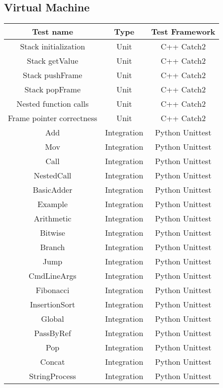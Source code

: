 \documentclass[manuscript,screen,nonacm]{acmart}
\begin{document}
\subsection{Virtual Machine}

\begin{center}
\begin{tabular}{|c|c|c|}
    \hline
    Test name & Type & Test Framework \\
    \hline
    Stack initialization & Unit & C++ Catch2 \\
    Stack getValue & Unit & C++ Catch2 \\
    Stack pushFrame & Unit & C++ Catch2 \\
    Stack popFrame & Unit & C++ Catch2 \\
    Nested function calls & Unit & C++ Catch2 \\
    Frame pointer correctness & Unit & C++ Catch2 \\
    Add & Integration & Python Unittest \\
    Mov & Integration & Python Unittest \\
    Call & Integration & Python Unittest \\
    NestedCall & Integration & Python Unittest \\
    BasicAdder & Integration & Python Unittest \\
    Example & Integration & Python Unittest \\
    Arithmetic & Integration & Python Unittest \\
    Bitwise & Integration & Python Unittest \\
    Branch & Integration & Python Unittest \\
    Jump & Integration & Python Unittest \\
    CmdLineArgs & Integration & Python Unittest \\
    Fibonacci & Integration & Python Unittest \\
    InsertionSort & Integration & Python Unittest \\
    Global & Integration & Python Unittest \\
    PassByRef & Integration & Python Unittest \\
    Pop & Integration & Python Unittest \\
    Concat & Integration & Python Unittest \\
    StringProcess & Integration & Python Unittest \\
    \hline
\end{tabular}
\end{center}
\end{document}
